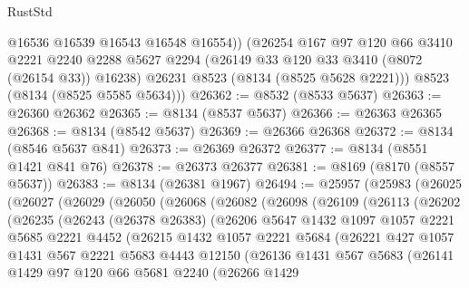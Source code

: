 \begin{lexlean}{RustStd}
\begin{coremodule}
{\begin{coremodule}
{{{{{{{{{{{{{{{{{{{{{{{{{{{{{{{{{{{{{{{{{{{{{{{{{{{{{          @16536
          @16539
          @16543
          @16548
          @16554))
      (@26254
        @167
        @97
        @120
        @66
        @3410
        @2221
        @2240
        @2288
        @5627
        @2294
        (@26149 @33 @120 @33 @3410 (@8072 (@26154 @33)) @16238)
        @26231
        @8523
        (@8134 (@8525 @5628 @2221)))
      @8523
      (@8134 (@8525 @5585 @5634)))
@26362 := @8532 (@8533 @5637)
@26363 := @26360 @26362
@26365 := @8134 (@8537 @5637)
@26366 := @26363 @26365
@26368 := @8134 (@8542 @5637)
@26369 := @26366 @26368
@26372 := @8134 (@8546 @5637 @841)
@26373 := @26369 @26372
@26377 := @8134 (@8551 @1421 @841 @76)
@26378 := @26373 @26377
@26381 := @8169 (@8170 (@8557 @5637))
@26383 := @8134 (@26381 @1967)
@26494 := @25957
    (@25983
      (@26025
        (@26027
          (@26029
            (@26050
              (@26068
                (@26082
                  (@26098
                    (@26109
                      (@26113
                        (@26202
                          (@26235
                            (@26243
                              (@26378 @26383)
                              (@26206
                                @5647
                                @1432
                                @1097
                                @1057
                                @2221
                                @5685
                                @2221
                                @4452
                                (@26215
                                  @1432
                                  @1057
                                  @2221
                                  @5684
                                  (@26221
                                    @427
                                    @1057
                                    @1431
                                    @567
                                    @2221
                                    @5683
                                    @4443
                                    @12150
                                    (@26136
                                      @1431
                                      @567
                                      @5683
                                      (@26141
                                        @1429
                                        @97
                                        @120
                                        @66
                                        @5681
                                        @2240
                                        (@26266
                                          @1429
}}}}}}}}}}}}}}}}}}}}}}}}}}}}}}}}}}}}}}}}}}}}}}}}}}}}}
\end{coremodule}}
\end{coremodule}
\end{lexlean}
